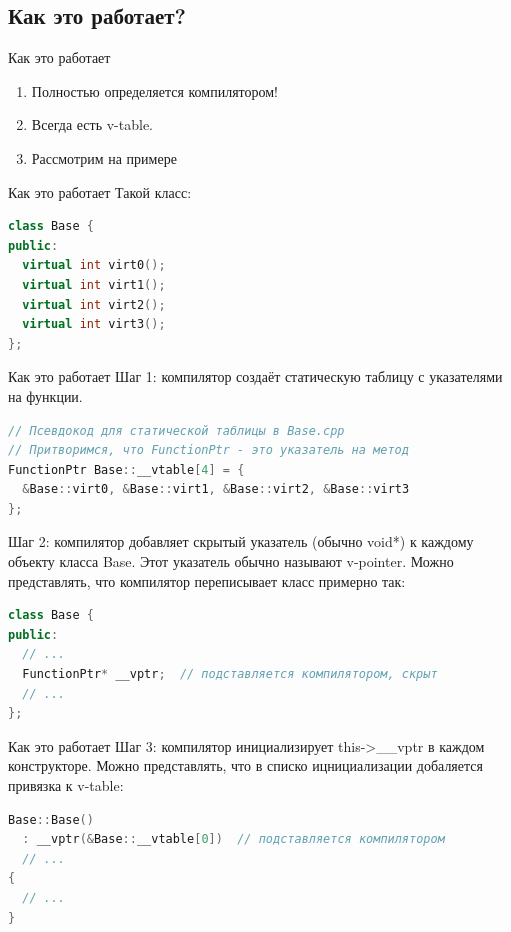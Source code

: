\documentclass[10pt]{beamer}
\begin{document}
\subsection{Как это работает?}
\begin{frame}[fragile]{Как это работает}
\begin{enumerate}
    \item Полностью определяется компилятором!
    \item Всегда есть v-table.
    \item Рассмотрим на примере
\end{enumerate}
\end{frame}

\begin{frame}[fragile]{Как это работает}
Такой класс:
\begin{lstlisting}[language=C++]
class Base {
public:
  virtual int virt0();
  virtual int virt1();
  virtual int virt2();
  virtual int virt3();
};
\end{lstlisting}
\end{frame}


\begin{frame}[fragile]{Как это работает}
Шаг 1: компилятор создаёт статическую таблицу с указателями на функции.
\begin{lstlisting}[language=C++]
// Псевдокод для статической таблицы в Base.cpp
// Притворимся, что FunctionPtr - это указатель на метод
FunctionPtr Base::__vtable[4] = {
  &Base::virt0, &Base::virt1, &Base::virt2, &Base::virt3
};
\end{lstlisting}
\vspace{5mm}
Шаг 2: компилятор добавляет скрытый указатель (обычно void*) к каждому объекту класса Base. Этот указатель обычно называют v-pointer. Можно представлять, что компилятор переписывает класс примерно так:

\begin{lstlisting}[language=C++]
class Base {
public:
  // ...
  FunctionPtr* __vptr;  // подставляется компилятором, скрыт
  // ...
};
\end{lstlisting}
\end{frame}

\begin{frame}[fragile]{Как это работает}
Шаг 3: компилятор инициализирует this->\_\_vptr в каждом конструкторе. Можно представлять, что в списко ицнициализации добаляется привязка к v-table:
\begin{lstlisting}[language=C++]
Base::Base()
  : __vptr(&Base::__vtable[0])  // подставляется компилятором
  // ...
{
  // ...
}
\end{lstlisting}
\end{frame}
\end{document}
